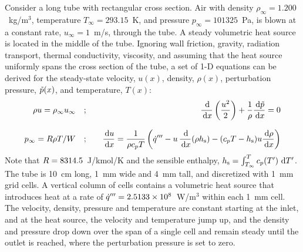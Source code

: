 \documentclass[11pt]{book}
\begin{document}
Consider a long tube with rectangular cross section. Air with density $\rho_\infty=1.200$~kg/m$^3$, temperature $T_\infty=293.15$~K, and pressure $p_\infty=101325$~Pa, is blown at a constant rate, $u_\infty=1$~m/s, through the tube. A steady volumetric heat source is located in the middle of the tube. Ignoring wall friction, gravity, radiation transport, thermal conductivity, viscosity, and assuming that the heat source uniformly spans the cross section of the tube, a set of 1-D equations can be derived for the steady-state velocity, $u(x)$, density, $\rho(x)$, perturbation pressure, $\tilde{p}(x)$, and temperature, $T(x)$:
\begin{eqnarray}
   \rho u = \rho_\infty u_\infty   \quad &;& \quad \frac{\,\mathrm{d}}{\,\mathrm{d} x} \left( \frac{u^2}{2} \right) + \frac{1}{\rho} \frac{\,\mathrm{d} \tilde{p}}{\,\mathrm{d} x} = 0 \label{mom1d} \\[.1in]
   p_\infty = R \rho T / W            \quad &;& \quad \frac{\,\mathrm{d} u}{\,\mathrm{d} x} = \frac{1}{\rho c_p T} \left( \dot{q}''' - u \, \frac{\,\mathrm{d}}{\,\mathrm{d} x} (\rho h_{\rm s}) - (c_p T - h_{\rm s}) u \frac{\,\mathrm{d} \rho}{\,\mathrm{d} x}  \right)  \label{div1d}
\end{eqnarray}
Note that $R=8314.5$~J/kmol/K and the sensible enthalpy, $h_{\rm s}=\int_{T_\infty}^T c_p(T') \, \,\mathrm{d} T'$. The tube is 10~cm long, 1~mm wide and 4~mm tall, and discretized with 1~mm grid cells. A vertical column of cells contains a volumetric heat source that introduces heat at a rate of $\dot{q}'''=2.5133 \times 10^8$~W/m$^3$ within each 1~mm cell. The velocity, density, pressure and temperature are constant starting at the inlet, and at the heat source, the velocity and temperature jump up, and the density and pressure drop down over the span of a single cell and remain steady until the outlet is reached, where the perturbation pressure is set to zero.
\end{document}
